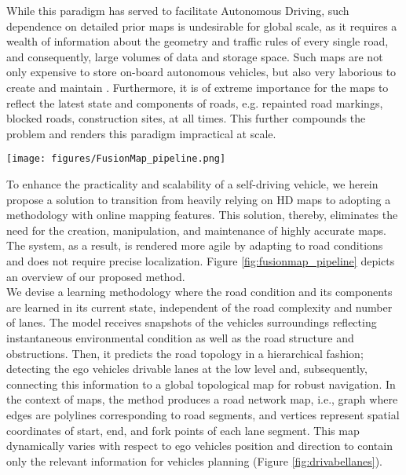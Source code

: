 \documentclass[10pt,twocolumn,letterpaper]{article}
\begin{document}
While this paradigm has served to facilitate Autonomous Driving, such dependence on detailed prior maps is undesirable for global scale, as it requires a wealth of information about the geometry and traffic rules of every single road, and consequently, large volumes of data and storage space. Such maps are not only expensive to store on-board autonomous vehicles, but also very laborious to create and maintain \cite{homayounfar2018hierarchical}. Furthermore, it is of extreme importance for the maps to reflect the latest state and components of roads, e.g. repainted road markings, blocked roads, construction sites, at all times. This further compounds the problem and renders this paradigm impractical at scale. 
\begin{figure*}[tb!]
     \centering
     \texttt{[image: figures/FusionMap\_pipeline.png]}
     \caption{Overview of our road topology learning pipeline. Our model is a multi-stage, multi-task network trained to sequentially create the map components starting from the segmented lanes up to the complete road topology.}
     \label{fig:fusionmap_pipeline}
\end{figure*}

To enhance the practicality and scalability of a self-driving vehicle, we herein propose a solution to transition from heavily relying on HD maps to adopting a methodology with online mapping features. This solution, thereby, eliminates the need for the creation, manipulation, and maintenance of highly accurate maps. The system, as a result, is rendered more agile by adapting to road conditions and does not require precise localization. Figure \ref{fig:fusionmap_pipeline} depicts an overview of our proposed method.\\
We devise a learning methodology where the road condition and its components are learned in its current state, independent of the road complexity and number of lanes. The model receives snapshots of the vehicle\textquotesingle s surroundings reflecting instantaneous environmental condition as well as the road structure and obstructions. Then, it predicts the road topology in a hierarchical fashion; detecting the ego vehicle\textquotesingle s drivable lanes at the low level and, subsequently, connecting this information to a global topological map for robust navigation. In the context of maps, the method produces a road network map, i.e., graph where edges are polylines corresponding to road segments, and vertices represent spatial coordinates of start, end, and fork points of each lane segment. This map dynamically varies with respect to ego vehicle\textquotesingle s position and direction to contain only the relevant information for vehicle\textquotesingle s planning (Figure \ref{fig:drivabellanes}).
\end{document}
